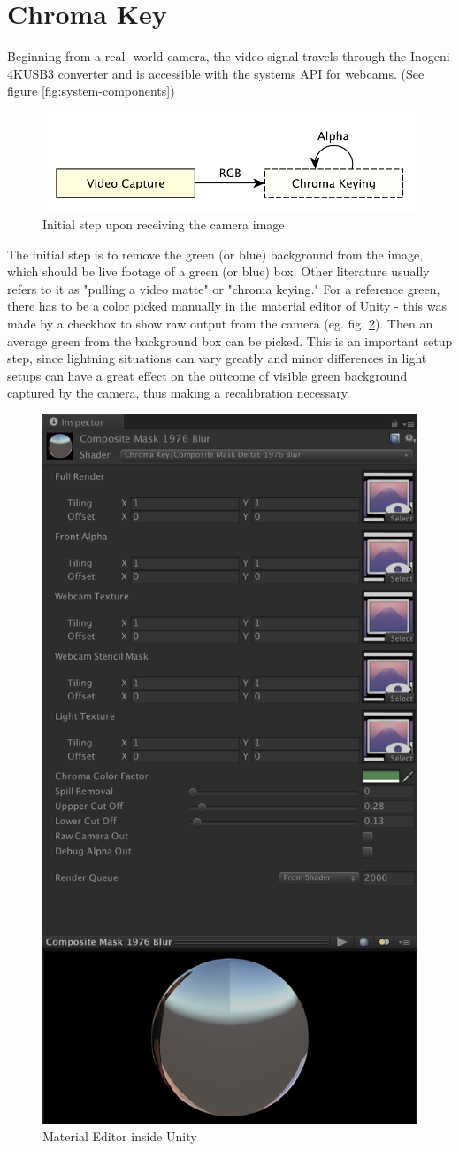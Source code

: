 %
\section{Chroma Key}
\label{sec:chromakey}

Beginning from a real-
world camera, the video signal travels through the 
Inogeni 4KUSB3 converter and is accessible with the systems API for webcams. 
(See figure \ref{fig:system-components})

\begin{figure}[htb]
	\centering
	\includegraphics[width=.7\textwidth]{gfx/pipeline/4_1_chroma.pdf}
	\caption{Initial step upon receiving the camera image}
	\label{fig:steps:chroma}
\end{figure}

The initial step is to remove the green (or blue) background from the image, 
which should be live footage of a green (or blue) box. Other literature usually 
refers to it as "pulling a video matte" or "chroma keying." For a reference 
green, there has to be a color picked manually in the material editor of Unity 
- this was made by a checkbox to show raw output from the camera (eg. fig. 
\ref{fig:chroma:editor}). Then an average green from the background box can be 
picked. This is an important setup step, since lightning situations can vary 
greatly and minor differences in light setups can have a great effect on the 
outcome of visible green background captured by the camera, thus making a 
recalibration necessary.

\begin{figure}[htb]
	\centering
	\includegraphics[width=.45\textwidth]{gfx/distances/material-editor.png}
	\caption{Material Editor inside Unity}
	\label{fig:chroma:editor}
\end{figure}

